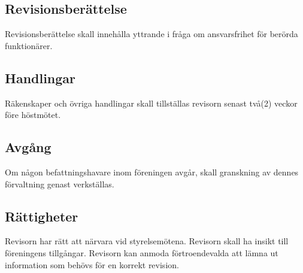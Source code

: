 \documentclass[11pt,a4paper]{article}
\begin{document}
\subsection{Revisionsberättelse}
Revisionsberättelse skall innehålla yttrande i fråga om ansvarsfrihet för berörda 
funktionärer. 
\subsection{Handlingar}
Räkenskaper och övriga handlingar skall tillställas revisorn senast två(2) veckor före höstmötet.
\subsection{Avgång}
Om någon befattningshavare inom föreningen avgår, skall granskning av dennes 
förvaltning genast verkställas.
\subsection{Rättigheter}
Revisorn har rätt att närvara vid styrelsemötena. Revisorn skall ha insikt till föreningens tillgångar. Revisorn kan anmoda förtroendevalda att lämna ut information som behövs för en korrekt revision.
\end{document}
